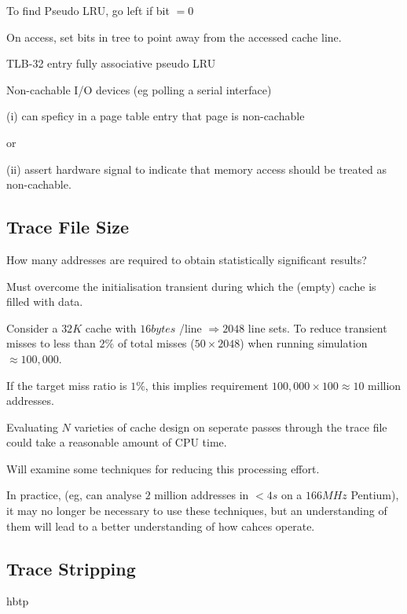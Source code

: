 \documentclass[a4paper,12pt]{article}
\begin{document}
\begin{table}[hbtp]


\caption{To find Pseudo LRU, go left if bit $= 0$}

\end{table}

On access, set bits in tree to point away from the accessed cache line.

TLB-32 entry fully associative pseudo LRU


Non-cachable I/O devices (eg polling a serial interface)

(i) can speficy in a page table entry that page is non-cachable

or

(ii) assert hardware signal to indicate that memory access should be
treated as non-cachable.

\subsection*{Trace File Size}

How many addresses are required to obtain statistically significant
results?

Must overcome the initialisation transient during which the (empty)
cache is filled with data.

Consider a $32K$ cache with $16 bytes$ /line $\Rightarrow 2048$ line
sets. To reduce transient misses to less than $2\%$ of total misses ($50
\times 2048$) when running simulation $\approx 100,000$.

If the target miss ratio is $1\%$, this implies requirement $100,000
\times 100 \approx 10$ million addresses.

Evaluating $N$ varieties of cache design on seperate passes through the
trace file could take a reasonable amount of CPU time.

Will examine some techniques for reducing this processing effort.

In practice, (eg, can analyse $2$ million addresses in  $< 4 s$ on a
$166 MHz$ Pentium), it may no longer be necessary to use these
techniques, but an understanding of them will lead to a better
understanding of how cahces operate.

\subsection*{Trace Stripping}

\begin{table}{hbtp}


\end{table}
\end{document}
